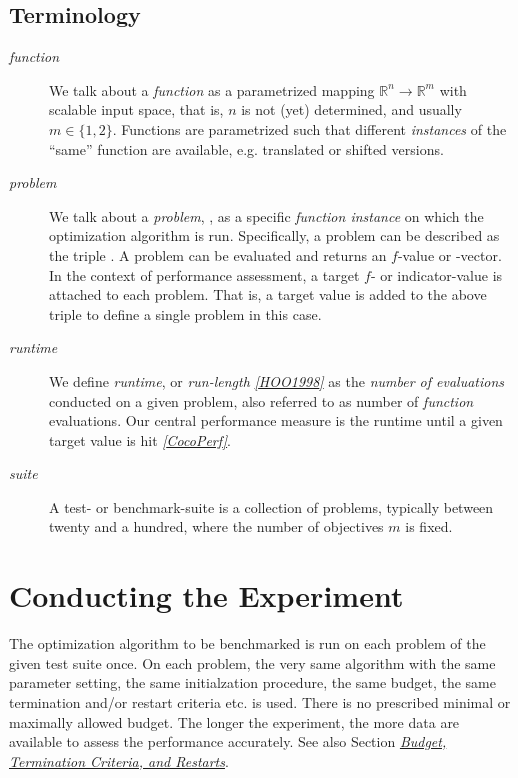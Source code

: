 \documentclass[letterpaper,12pt,english]{article}
\begin{document}
\subsection{Terminology}
\label{index:terminology}\begin{description}
\item[{\emph{function}}] \leavevmode
We talk about a \emph{function} as a parametrized mapping
\(\mathbb{R}^n\to\mathbb{R}^m\) with scalable input space, that is,
\(n\) is not (yet) determined, and usually \(m\in\{1,2\}\).
Functions are parametrized such that different \emph{instances} of the
``same'' function are available, e.g. translated or shifted versions.

\item[{\emph{problem}}] \leavevmode
We talk about a \emph{problem}, \href{http://numbbo.github.io/coco-doc/C/coco\_8h.html\#a408ba01b98c78bf5be3df36562d99478}{}, as a specific \emph{function
instance} on which the optimization algorithm is run. Specifically, a problem
can be described as the triple . A problem
can be evaluated and returns an \(f\)-value or -vector.
In the context of performance
assessment, a target \(f\)- or indicator-value
is attached to each problem. That is, a target value is added to the
above triple to define a single problem in this case.

\item[{\emph{runtime}}] \leavevmode
We define \emph{runtime}, or \emph{run-length} \label{index:id8}{\hyperref[index:hoo1998]{\emph{{[}HOO1998{]}}}}
as the \emph{number of evaluations}
conducted on a given problem, also referred to as number of \emph{function} evaluations.
Our central performance measure is the runtime until a given target value
is hit \label{index:id9}{\hyperref[index:cocoperf]{\emph{{[}CocoPerf{]}}}}.

\item[{\emph{suite}}] \leavevmode
A test- or benchmark-suite is a collection of problems, typically between
twenty and a hundred, where the number of objectives \(m\) is fixed.

\end{description}


\section{Conducting the Experiment}
\label{index:conducting-the-experiment}
The optimization algorithm to be benchmarked is run on each problem of the
given test suite once. On each problem, the very same algorithm with the same
parameter setting, the same initialzation procedure, the same budget, the same
termination and/or restart criteria etc. is used.
There is no prescribed minimal or maximally allowed budget. The longer the
experiment, the more data are available to assess the performance accurately.
See also Section {\hyperref[index:sec\string-budget]{\emph{Budget, Termination Criteria, and Restarts}}}.
\end{document}
